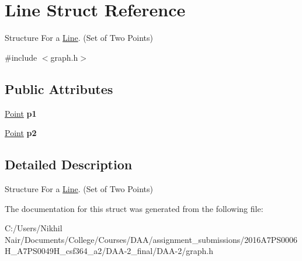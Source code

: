 \hypertarget{struct_line}{}\section{Line Struct Reference}
\label{struct_line}


Structure For a \mbox{\hyperlink{struct_line}{Line}}. (Set of Two Points)  




{\ttfamily \#include $<$graph.\+h$>$}

\subsection*{Public Attributes}
\begin{DoxyCompactItemize}
\item 
\mbox{\label{struct_line_a2ae082894080ee1d0757c40c2b4a7daf}} 
\mbox{\hyperlink{struct_point}{Point}} {\bfseries p1}
\item 
\mbox{\label{struct_line_abebd4172ec43b06b1b04bb59904fc2a4}} 
\mbox{\hyperlink{struct_point}{Point}} {\bfseries p2}
\end{DoxyCompactItemize}


\subsection{Detailed Description}
Structure For a \mbox{\hyperlink{struct_line}{Line}}. (Set of Two Points) 



The documentation for this struct was generated from the following file\+:\begin{DoxyCompactItemize}
\item 
C\+:/\+Users/\+Nikhil Nair/\+Documents/\+College/\+Courses/\+D\+A\+A/assignment\+\_\+submissions/2016\+A7\+P\+S0006\+H\+\_\+A7\+P\+S0049\+H\+\_\+csf364\+\_\+a2/\+D\+A\+A-\/2\+\_\+final/\+D\+A\+A-\/2/graph.\+h\end{DoxyCompactItemize}
